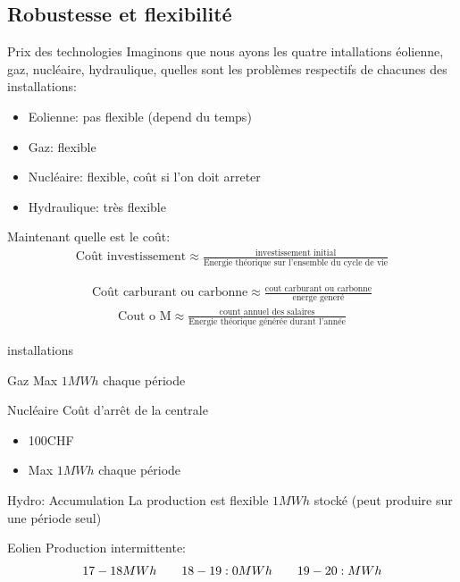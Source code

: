 \subsection{Robustesse et flexibilité}
\begin{parag}{Prix des technologies}
    Imaginons que nous ayons les quatre intallations éolienne, gaz, nucléaire, hydraulique, quelles sont les problèmes respectifs de chacunes des installations:
    \begin{itemize}
	    \item Eolienne: pas flexible (depend du temps)
	    \item Gaz: flexible
	    \item Nucléaire: flexible, coût si l'on doit arreter
	    \item Hydraulique: très flexible
    \end{itemize}
    Maintenant quelle est le coût:
    \begin{align*} \text{Coût investissement} \approx \frac{\text{investissement initial}}{\text{Energie théorique sur l'ensemble du cycle de vie}} \end{align*}
    
    \begin{align*} \text{Coût carburant ou carbonne} \approx \frac{\text{cout carburant ou carbonne}}{\text{energe generé}} \end{align*}
    \begin{align*} \text{Cout o M}\approx \frac{\text{count annuel des salaires}}{\text{Energie théorique générée durant l'année}} \end{align*}
\end{parag}
\begin{parag}{installations}
	\begin{subparag}{Gaz}
	    Max $1MWh$ chaque période
	\end{subparag}
	\begin{subparag}{Nucléaire}
	    Coût d'arrêt de la centrale
	    \begin{itemize}
		    \item 100CHF
		    \item Max $1MWh$ chaque période
	    \end{itemize}
	    
	\end{subparag}
   \begin{subparag}{Hydro: Accumulation}
	   La production est flexible $1MWh$ stocké (peut produire sur une période seul)
   \end{subparag} 
   \begin{subparag}{Eolien}
       Production intermittente:
       \begin{align*} 17-18MWh \quad \quad 18-19:0MWh \quad \quad 19-20:MWh \end{align*}
   \end{subparag}
\end{parag}

